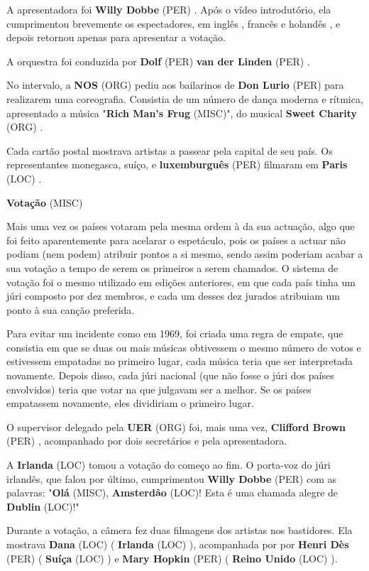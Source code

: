\documentclass[12pt,a4paper]{article}
\begin{document}
A apresentadora foi \textbf{Willy Dobbe} (PER) . Após o vídeo introdutório, ela cumprimentou brevemente os espectadores, em inglês , francês e holandês , e depois retornou apenas para apresentar a votação.

A orquestra foi conduzida por \textbf{Dolf} (PER) \textbf{van der Linden} (PER) .

No intervalo, a \textbf{NOS} (ORG) pediu aos bailarinos de \textbf{Don Lurio} (PER) para realizarem uma coreografia. Consistia de um número de dança moderna e rítmica, apresentado a música "\textbf{Rich Man's Frug} (MISC)", do musical \textbf{Sweet Charity} (ORG) .

Cada cartão postal mostrava artistas a passear pela capital de seu país. Os representantes monegasca, suíço, e \textbf{luxemburguês} (PER) filmaram em \textbf{Paris} (LOC) .



\textbf{Votação} (MISC)

Mais uma vez os países votaram pela mesma ordem à da sua actuação, algo que foi feito aparentemente para acelarar o espetáculo, pois os países a actuar não podiam (nem podem) atribuir pontos a si mesmo, sendo assim poderiam acabar a sua votação a tempo de serem os primeiros a serem chamados. O sistema de votação foi o mesmo utilizado em edições anteriores, em que cada país tinha um júri composto por dez membros, e cada um desses dez jurados atribuiam um ponto à sua canção preferida.

Para evitar um incidente como em 1969, foi criada uma regra de empate, que consistia em que se duas ou mais músicas obtivessem o mesmo número de votos e estivessem empatadas no primeiro lugar, cada música teria que ser interpretada novamente. Depois disso, cada júri nacional (que não fosse o júri dos países envolvidos) teria que votar na que julgavam ser a melhor. Se os países empatassem novamente, eles dividiriam o primeiro lugar.

O supervisor delegado pela \textbf{UER} (ORG) foi, mais uma vez, \textbf{Clifford Brown} (PER) , acompanhado por dois secretários e pela apresentadora.

A \textbf{Irlanda} (LOC) tomou a votação do começo ao fim. O porta-voz do júri irlandês, que falou por último, cumprimentou \textbf{Willy Dobbe} (PER) com as palavras: "\textbf{Olá} (MISC), \textbf{Amsterdão} (LOC)! Esta é uma chamada alegre de \textbf{Dublin} (LOC)!"

Durante a votação, a câmera fez duas filmagens dos artistas nos bastidores. Ela mostrava \textbf{Dana} (LOC) ( \textbf{Irlanda} (LOC) ), acompanhada por por \textbf{Henri Dès} (PER) ( \textbf{Suíça} (LOC) ) e \textbf{Mary Hopkin} (PER) ( \textbf{Reino Unido} (LOC) ).
\end{document}
